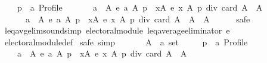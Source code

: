 \begin{isabellebody}
\ \ \ \ p\ {\isacharcolon}{\kern0pt}{\isacharcolon}{\kern0pt}\ {\isachardoublequoteopen}{\isacharprime}{\kern0pt}a\ Profile{\isachardoublequoteclose}\isanewline
\ \ \isamarkupfalse%
\isanewline
\ \ \ \ {\isachardoublequoteopen}{\isacharbraceleft}{\kern0pt}a\ {\isasymin}\ A{\isachardot}{\kern0pt}\ e\ a\ A\ p\ {\isacharless}{\kern0pt}\ {\isacharparenleft}{\kern0pt}{\isasymSum}x{\isasymin}A{\isachardot}{\kern0pt}\ e\ x\ A\ p{\isacharparenright}{\kern0pt}\ div\ card\ A{\isacharbraceright}{\kern0pt}\ {\isasymnoteq}\ A\ {\isasymlongrightarrow}\isanewline
\ \ \ \ \ \ {\isacharbraceleft}{\kern0pt}a\ {\isasymin}\ A{\isachardot}{\kern0pt}\ e\ a\ A\ p\ {\isacharless}{\kern0pt}\ {\isacharparenleft}{\kern0pt}{\isasymSum}x{\isasymin}A{\isachardot}{\kern0pt}\ e\ x\ A\ p{\isacharparenright}{\kern0pt}\ div\ card\ A{\isacharbraceright}{\kern0pt}\ {\isasymunion}\ A\ {\isacharequal}{\kern0pt}\ A{\isachardoublequoteclose}\isanewline
\ \ \ \ \isamarkupfalse%
\ safe\isanewline
{}\isamarkupfalse%
%
\endisatagproof
{\isafoldproof}%
%
\isadelimproof
\isanewline
%
\endisadelimproof
\isanewline
{}\isamarkupfalse%
\ leq{\isacharunderscore}{\kern0pt}avg{\isacharunderscore}{\kern0pt}elim{\isacharunderscore}{\kern0pt}sound{\isacharbrackleft}{\kern0pt}simp{\isacharbrackright}{\kern0pt}{\isacharcolon}{\kern0pt}\ {\isachardoublequoteopen}electoral{\isacharunderscore}{\kern0pt}module\ {\isacharparenleft}{\kern0pt}leq{\isacharunderscore}{\kern0pt}average{\isacharunderscore}{\kern0pt}eliminator\ e{\isacharparenright}{\kern0pt}{\isachardoublequoteclose}\isanewline
%
\isadelimproof
\ \ %
\endisadelimproof
%
\isatagproof
{}\isamarkupfalse%
\ electoral{\isacharunderscore}{\kern0pt}module{\isacharunderscore}{\kern0pt}def\isanewline
{}\isamarkupfalse%
\ {\isacharparenleft}{\kern0pt}safe{\isacharcomma}{\kern0pt}\ simp{\isacharparenright}{\kern0pt}\isanewline
\ \ \isamarkupfalse%
\isanewline
\ \ \ \ A\ {\isacharcolon}{\kern0pt}{\isacharcolon}{\kern0pt}\ {\isachardoublequoteopen}{\isacharprime}{\kern0pt}a\ set{\isachardoublequoteclose}\ \isanewline
\ \ \ \ p\ {\isacharcolon}{\kern0pt}{\isacharcolon}{\kern0pt}\ {\isachardoublequoteopen}{\isacharprime}{\kern0pt}a\ Profile{\isachardoublequoteclose}\isanewline
\ \ \isamarkupfalse%
\isanewline
\ \ \ \ {\isachardoublequoteopen}{\isacharbraceleft}{\kern0pt}a\ {\isasymin}\ A{\isachardot}{\kern0pt}\ e\ a\ A\ p\ {\isasymle}\ {\isacharparenleft}{\kern0pt}{\isasymSum}x{\isasymin}A{\isachardot}{\kern0pt}\ e\ x\ A\ p{\isacharparenright}{\kern0pt}\ div\ card\ A{\isacharbraceright}{\kern0pt}\ {\isasymnoteq}\ A\ {\isasymlongrightarrow}\isanewline

\end{isabellebody}
